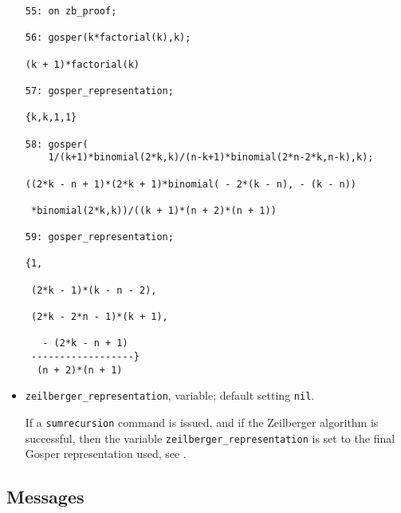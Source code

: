 \begin{itemize}
{\small
\begin{verbatim}
55: on zb_proof;

56: gosper(k*factorial(k),k);

(k + 1)*factorial(k)

57: gosper_representation;

{k,k,1,1}

58: gosper(
    1/(k+1)*binomial(2*k,k)/(n-k+1)*binomial(2*n-2*k,n-k),k);

((2*k - n + 1)*(2*k + 1)*binomial( - 2*(k - n), - (k - n))

 *binomial(2*k,k))/((k + 1)*(n + 2)*(n + 1))

59: gosper_representation;

{1,

 (2*k - 1)*(k - n - 2),

 (2*k - 2*n - 1)*(k + 1),

   - (2*k - n + 1)
 ------------------}
  (n + 2)*(n + 1)
\end{verbatim}
}\noindent
\item
{\tt zeilberger\verb+_+representation}, variable; default setting {\tt nil}.

If a {\tt sumrecursion} command is issued, and if the Zeilberger
algorithm is successful, then the variable 
{\tt zeilberger\verb+_+representation} is set to the final Gosper
representation used, see \cite{Koornwinder}.
\end{itemize}

\subsection{Messages}

